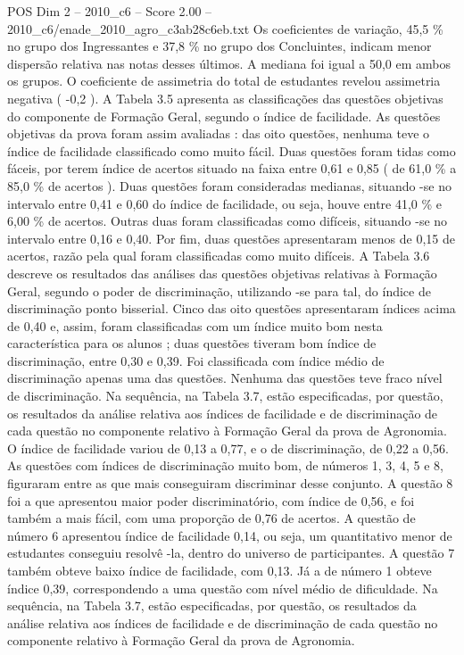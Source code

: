 \begin{textsample}{POS Dim 2 – 2010\_c6 – Score 2.00 – 2010\_c6/enade\_2010\_agro\_c3ab28c6eb.txt}
Os coeficientes de variação, 45,5 \% no grupo dos Ingressantes e 37,8 \% no grupo dos Concluintes, indicam menor dispersão relativa nas notas desses últimos.
A mediana foi igual a 50,0 em ambos os grupos.
O coeficiente de assimetria do total de estudantes revelou assimetria negativa ( -0,2 ).
A Tabela 3.5 apresenta as classificações das questões objetivas do componente de Formação Geral, segundo o índice de facilidade.
As questões objetivas da prova foram assim avaliadas : das oito questões, nenhuma teve o índice de facilidade classificado como muito fácil.
Duas questões foram tidas como fáceis, por terem índice de acertos situado na faixa entre 0,61 e 0,85 ( de 61,0 \% a 85,0 \% de acertos ).
Duas questões foram consideradas medianas, situando -se no intervalo entre 0,41 e 0,60 do índice de facilidade, ou seja, houve entre 41,0 \% e 6,00 \% de acertos.
Outras duas foram classificadas como difíceis, situando -se no intervalo entre 0,16 e 0,40.
Por fim, duas questões apresentaram menos de 0,15 de acertos, razão pela qual foram classificadas como muito difíceis.
A Tabela 3.6 descreve os resultados das análises das questões objetivas relativas à Formação Geral, segundo o poder de discriminação, utilizando -se para tal, do índice de discriminação ponto bisserial.
Cinco das oito questões apresentaram índices acima de 0,40 e, assim, foram classificadas com um índice muito bom nesta característica para os alunos ; duas questões tiveram bom índice de discriminação, entre 0,30 e 0,39.
Foi classificada com índice médio de discriminação apenas uma das questões.
Nenhuma das questões teve fraco nível de discriminação.
Na sequência, na Tabela 3.7, estão especificadas, por questão, os resultados da análise relativa aos índices de facilidade e de discriminação de cada questão no componente relativo à Formação Geral da prova de Agronomia.
O índice de facilidade variou de 0,13 a 0,77, e o de discriminação, de 0,22 a 0,56.
As questões com índices de discriminação muito bom, de números 1, 3, 4, 5 e 8, figuraram entre as que mais conseguiram discriminar desse conjunto.
A questão 8 foi a que apresentou maior poder discriminatório, com índice de 0,56, e foi também a mais fácil, com uma proporção de 0,76 de acertos.
A questão de número 6 apresentou índice de facilidade 0,14, ou seja, um quantitativo menor de estudantes conseguiu resolvê -la, dentro do universo de participantes.
A questão 7 também obteve baixo índice de facilidade, com 0,13.
Já a de número 1 obteve índice 0,39, correspondendo a uma questão com nível médio de dificuldade.
Na sequência, na Tabela 3.7, estão especificadas, por questão, os resultados da análise relativa aos índices de facilidade e de discriminação de cada questão no componente relativo à Formação Geral da prova de Agronomia.

\end{textsample}
